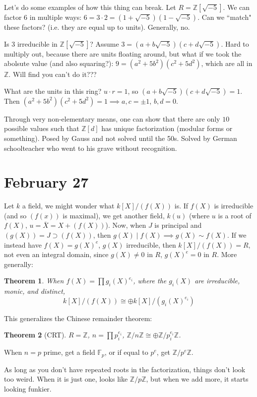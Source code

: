 \documentclass{article}
\theoremstyle{plain}
\newtheorem{theorem}{Theorem}
\theoremstyle{remark}
\newcommand{\Z}{{\mathbb Z}}
\begin{document}
Let's do some examples of how this thing can break.
Let $R = \Z[\sqrt{-5}]$.
We can factor $6$ in multiple ways: $6 = 3 \cdot 2 = (1+\sqrt{-5})(1-\sqrt{-5})$.
Can we ``match" these factors? (i.e. they are equal up to units).
Generally, no.

Is $3$ irreducible in $\Z[\sqrt{-5}]$?
Assume $3 = (a + b\sqrt{-5})(c +d\sqrt{-5})$.
Hard to multiply out, because there are units floating around,
but what if we took the abolsute value
(and also squaring?):
$9 = (a^2 + 5b^2)(c^2 + 5d^2)$, which are all in $\Z$.
Will find you can't do it???

What are the units in this ring?
$u \cdot r = 1$,
so $(a+b\sqrt{-5})(c+d\sqrt{-5}) = 1$.
Then $(a^2+5b^2)(c^2+5d^2) = 1 \implies a,c = \pm 1$, $b,d = 0$.

Through very non-elementary means,
one can show that there are only $10$ possible values such that $\Z[d]$
has unique factorization (modular forms or something).
Posed by Gauss and not solved until the 50s.
Solved by German schoolteacher who went to his grave without recognition.


\section{February 27}
Let $k$ a field, we might wonder what $k[X]/(f(X))$ is.
If $f(X)$ is irreducible (and so $(f(x))$ is maximal),
we get another field, $k(u)$
(where $u$ is a root of $f(X)$, $u = \bar{X} = X + (f(X))$).
Now, when $J$ is principal and $(g(X)) = J \supset (f(X))$,
then $g(X) \mid f(X) \implies g(X) \sim f(X)$.
If we instead have $f(X) = g(X)^e$, $g(X)$ irreducible,
then $k[X]/(f(X)) = R$,
not even an integral domain, since
$g(X) \neq 0$ in $R$, $g(X)^e = 0$ in $R$.
More generally:
\begin{theorem}
	When $f(X) = \prod g_i(X)^{e_i}$,
	where the $g_i(X)$ are irreducible, monic, and distinct,
	\[
		k[X]/(f(X)) \cong \oplus k[X]/(g_i(X)^{e_i})
	\]
\end{theorem}
This generalizes the Chinese remainder theorem:
\begin{theorem}[CRT]
	$R = \Z$, $n = \prod p_i^{e_i}$, $\Z/n\Z \cong \oplus \Z/p_i^{e_i}\Z$.
\end{theorem}
When $n = p$ prime, get a field $\mathbb{F}_p$,
or if equal to $p^e$, get $\Z/p^e\Z$.

As long as you don't have repeated roots in the factorization,
things don't look too weird.
When it is just one, looks like $\Z/p\Z$,
but when we add more, it starts looking funkier.
\end{document}
